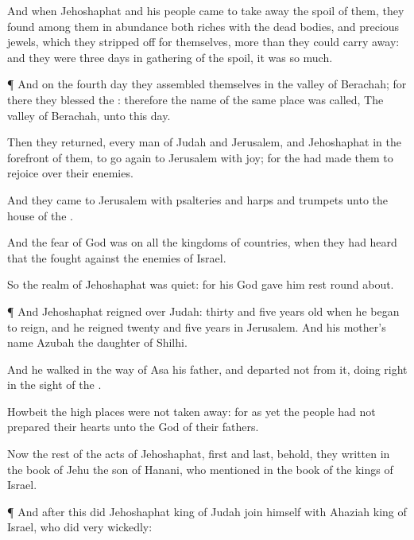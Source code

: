 {And when
Jehoshaphat and his
people
came to take
away the
spoil of them, they
found among them in
abundance both
riches with the dead
bodies, and
precious
jewels, which they stripped
off for themselves, more
than they could carry
away: and they were
three
days in
gathering of the
spoil, it was so
much.


\par }{\PP {}¶ And on the
fourth
day they
assembled themselves in the
valley of
Berachah; for there they
blessed the
{}: therefore the
name of the same
place was
called, The
valley of
Berachah, unto this
day.

Then they
returned, every
man of
Judah and
Jerusalem, and
Jehoshaphat in the
forefront of them, to go
again to
Jerusalem with
joy; for the
{} had made them to
rejoice over their
enemies.

And they
came to
Jerusalem with
psalteries and
harps and
trumpets unto the
house of the
{}.

And the
fear of
God was on all the
kingdoms of
{}
countries, when they had
heard that the
{}
fought against the
enemies of
Israel.

So the
realm of
Jehoshaphat was
quiet: for his
God gave him
rest round
about.


\par }{\PP {}¶ And
Jehoshaphat
reigned over
Judah:
{}
thirty and
five
years
old when he began to
reign, and he
reigned
twenty and
five
years in
Jerusalem. And his
mother’s
name
{}
Azubah the
daughter of
Shilhi.

And he
walked in the
way of
Asa his
father, and
departed not from it,
doing
{}
right in the
sight of the
{}.

Howbeit the high
places were not taken
away: for as yet the
people had not
prepared their
hearts unto the
God of their
fathers.

Now the
rest of the
acts of
Jehoshaphat,
first and
last, behold, they
{}
written in the
book of
Jehu the
son of
Hanani, who
{}
mentioned in the
book of the
kings of
Israel.


\par }{\PP {}¶ And
after this did
Jehoshaphat
king of
Judah
join himself with
Ahaziah
king of
Israel, who
did very
wickedly:

}
